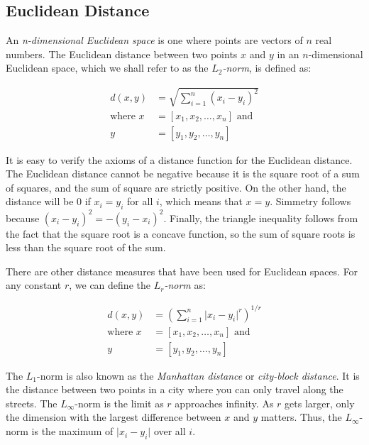 \subsection{Euclidean Distance}\label{subsec:euclidean-distance}

An \textit{n-dimensional Euclidean space} is one where points are vectors of $n$ real numbers. The Euclidean distance between two points $x$ and $y$ in an $n$-dimensional Euclidean space, which we shall refer to as the $L_2$\textit{-norm}, is defined as:

\begin{equation*}
    \begin{split}
        d(x, y) & = \sqrt{\sum_{i=1}^{n} (x_i - y_i)^2}\\
        \text{where } x & = [x_1, x_2, \dots, x_n] \text{ and }\\ 
                      y & = [y_1, y_2, \dots, y_n]
    \end{split}
\end{equation*}

It is easy to verify the axioms of a distance function for the Euclidean distance. The Euclidean distance cannot be negative because it is the square root of a sum of squares, and the sum of square are strictly positive. On the other hand, the distance will be $0$ if $x_i = y_i$ for all $i$, which means that $x = y$. Simmetry follows because $(x_i - y_i)^2 = -(y_i - x_i)^2$. Finally, the triangle inequality follows from the fact that the square root is a concave function, so the sum of square roots is less than the square root of the sum. 

There are other distance measures that have been used for Euclidean spaces. For any constant $r$, we can define the $L_r$\textit{-norm} as:

\begin{equation*}
    \begin{split}
    d(x, y) & = \left(\sum_{i=1}^{n} \vert x_i - y_i \vert ^ r \right)^{1/r}\\
        \text{where } x & = [x_1, x_2, \dots, x_n] \text{ and }\\ 
                      y & = [y_1, y_2, \dots, y_n]
    \end{split}
\end{equation*}

The $L_1$-norm is also known as the \textit{Manhattan distance} or \textit{city-block distance}. It is the distance between two points in a city where you can only travel along the streets. The $L_\infty$-norm is the limit as $r$ approaches infinity. As $r$ gets larger, only the dimension with the largest difference between $x$ and $y$ matters. Thus, the $L_\infty$-norm is the maximum of $\vert x_i - y_i \vert$ over all $i$.

